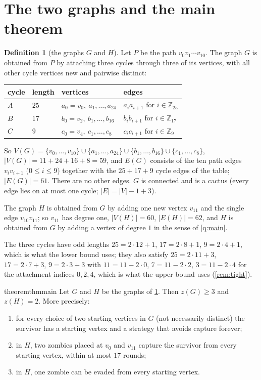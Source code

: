 \documentclass[11pt,a4paper]{article}
\theoremstyle{plain}
\theoremstyle{definition}
\newtheorem{definition}[theorem]{Definition}
\theoremstyle{remark}
\providecommand{\tightlist}{\setlength{\itemsep}{0pt}\setlength{\parskip}{0pt}}
\newcommand{\Z}{\mathbb Z}
\begin{document}
\section{The two graphs and the main theorem}

\begin{definition}[the graphs $G$ and $H$]\label{def:graphs}
Let $P$ be the path $v_0v_1\cdots v_{10}$. The graph $G$ is obtained from $P$ by attaching three cycles through three of its vertices, with all other cycle vertices new and pairwise distinct:
\begin{center}
\begin{tabular}{@{}llll@{}}
\toprule
cycle & length & vertices & edges \\
\midrule
$A$ & $25$ & $a_0=v_0,\ a_1,\dots,a_{24}$ & $a_ia_{i+1}$ for $i\in\Z_{25}$ \\
$B$ & $17$ & $b_0=v_2,\ b_1,\dots,b_{16}$ & $b_ib_{i+1}$ for $i\in\Z_{17}$ \\
$C$ & $9$ & $c_0=v_4,\ c_1,\dots,c_{8}$ & $c_ic_{i+1}$ for $i\in\Z_{9}$ \\
\bottomrule
\end{tabular}
\end{center}
So $V(G)=\{v_0,\dots,v_{10}\}\cup\{a_1,\dots,a_{24}\}\cup\{b_1,\dots,b_{16}\}\cup\{c_1,\dots,c_8\}$, $|V(G)|=11+24+16+8=59$, and $E(G)$ consists of the ten path edges $v_iv_{i+1}$ ($0\le i\le9$) together with the $25+17+9$ cycle edges of the table; $|E(G)|=61$. There are no other edges. $G$ is connected and is a cactus (every edge lies on at most one cycle; $|E|=|V|-1+3$).

The graph $H$ is obtained from $G$ by adding one new vertex $v_{11}$ and the single edge $v_{10}v_{11}$; so $v_{11}$ has degree one, $|V(H)|=60$, $|E(H)|=62$, and $H$ is obtained from $G$ by adding a vertex of degree $1$ in the sense of \cref{q:main}.
\end{definition}

The three cycles have odd lengths $25=2\cdot12+1$, $17=2\cdot8+1$, $9=2\cdot4+1$, which is what the lower bound uses; they also satisfy $25=2\cdot11+3$, $17=2\cdot7+3$, $9=2\cdot3+3$ with $11=11-2\cdot0$, $7=11-2\cdot2$, $3=11-2\cdot4$ for the attachment indices $0,2,4$, which is what the upper bound uses (\cref{rem:tight}).

\begin{restatable}{theorem}{thmmain}\label{thm:main}
Let $G$ and $H$ be the graphs of \cref{def:graphs}. Then $z(G)\ge3$ and $z(H)=2$. More precisely:
\begin{enumerate}[label=(\roman*)]\tightlist
\item for every choice of two starting vertices in $G$ (not necessarily distinct) the survivor has a starting vertex and a strategy that avoids capture forever;
\item in $H$, two zombies placed at $v_0$ and $v_{11}$ capture the survivor from every starting vertex, within at most $17$ rounds;
\item in $H$, one zombie can be evaded from every starting vertex.
\end{enumerate}
\end{restatable}
\end{document}
